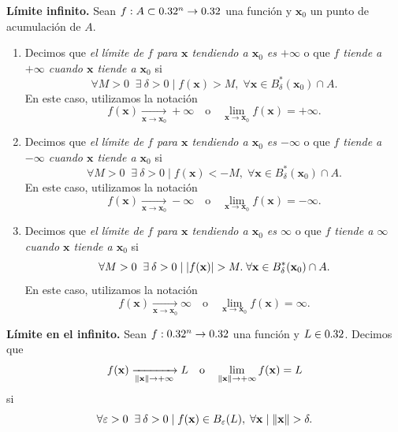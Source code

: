 \begin{definition}\textbf{L\'imite infinito.} \label{def:lim_inf}
  Sean $f : A \subset 0.32^n \to 0.32$ una funci\'on y $\mathbf{x}_0$ un punto de acumulaci\'on de $A$. 
  \begin{enumerate} %
   \item Decimos que \emph{el l\'imite de $f$ para $\mathbf{x}$ tendiendo a $\mathbf{x}_0$ es $+\infty$} o que \emph{$f$ tiende a $+\infty$ cuando $\mathbf{x}$ tiende a $\mathbf{x}_0$} si
    \[
      \forall M > 0\;\;\exists\: \delta > 0\;|\;f(\mathbf{x}) > M, \; \forall 
	  \mathbf{x} \in B_{\delta}^*(\mathbf{x}_0) \cap A.
    \]
    En este caso, utilizamos la notaci\'on
    \[
      f(\mathbf{x}) \xrightarrow[\mathbf{x} \to \mathbf{x}_0]{} +\infty \quad \text{o} \quad \lim_{\mathbf{x} \to \mathbf{x}_0} f(\mathbf{x}) = +\infty.
    \]
   \item Decimos que \emph{el l\'imite de $f$ para $\mathbf{x}$ tendiendo a $\mathbf{x}_0$ es $-\infty$} o que \emph{$f$ tiende a $-\infty$ cuando $\mathbf{x}$ tiende a $\mathbf{x}_0$} si
    \[
      \forall M > 0\;\;\exists\: \delta > 0 \;|\; f(\mathbf{x}) < -M, \; \forall 
	  \mathbf{x} \in B_{\delta}^*(\mathbf{x}_0) \cap A.
    \]
    En este caso, utilizamos la notaci\'on
    \[
      f(\mathbf{x}) \xrightarrow[\mathbf{x} \to \mathbf{x}_0]{} -\infty \quad \text{o} \quad \lim_{\mathbf{x} \to \mathbf{x}_0} f(\mathbf{x}) = -\infty.
    \]
   \item Decimos que \emph{el l\'imite de $f$ para $\mathbf{x}$ tendiendo a $\mathbf{x}_0$ es $\infty$} o que \emph{$f$ tiende a $\infty$ cuando $\mathbf{x}$ tiende a $\mathbf{x}_0$} si
    \[
      \forall M > 0 \;\; \exists\: \delta > 0 \;|\; \abs{f(\mathbf{x})} > M.\; \forall \mathbf{x} \in B_{\delta}^*(\mathbf{x}_0) \cap A.
    \]
    En este caso, utilizamos la notaci\'on
    \[
      f(\mathbf{x}) \xrightarrow[\mathbf{x} \to \mathbf{x}_0]{} \infty \quad \text{o} \quad \lim_{\mathbf{x} \to \mathbf{x}_0} f(\mathbf{x}) = \infty.
    \]
  \end{enumerate}
\end{definition}

\begin{definition}\textbf{L\'imite en el infinito.} \label{def:lim_x_inf}
Sean $f : 0.32^n \to 0.32$ una funci\'on y $L \in 0.32$. Decimos que
\[
 f(\mathbf{x}) \xrightarrow[\norm{\mathbf{x}} \to +\infty]{} L \quad \text{o} \quad \lim_{\norm{\mathbf{x}} \to +\infty} f(\mathbf{x}) = L
\]
si 
\[ 
 \forall \varepsilon > 0 \;\;\exists\: \delta > 0 \;|\; f(\mathbf{x}) \in B_{\varepsilon}(L),\; \forall 
 \mathbf{x} \;|\; \norm{\mathbf{x}} > \delta.
\]
\end{definition}

